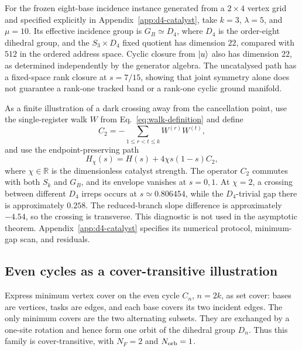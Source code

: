 For the frozen eight-base incidence instance generated from a $2\times4$
vertex grid and specified explicitly in Appendix~\ref{app:d4-catalyst}, take
$k=3$, $\lambda=5$, and $\mu=10$.  Its effective incidence group is
$G_B\simeq D_4$, where $D_4$ is the order-eight dihedral group, and the
$S_3\times D_4$ fixed quotient has dimension $22$,
compared with $512$ in the ordered address space.  Cyclic closure from
$\lvert u\rangle$ also has dimension $22$, as determined independently by the
generator algebra.  The uncatalysed path has a fixed-space rank closure at
$s=7/15$, showing that joint symmetry alone does not guarantee a rank-one
tracked band or a rank-one cyclic ground manifold.

As a finite illustration of a dark crossing away from the cancellation
point, use the single-register walk $W$ from
Eq.~\eqref{eq:walk-definition} and define
\begin{equation}
 C_2=-\sum_{1\leq r<t\leq k}W^{(r)}W^{(t)},
 \label{eq:d4-catalyst-operator}
\end{equation}
and use the endpoint-preserving path
\begin{equation}
 H_\chi(s)=H(s)+4\chi s(1-s)C_2,
 \label{eq:d4-catalyst-path}
\end{equation}
where $\chi\in\mathbb R$ is the dimensionless catalyst strength.
The operator $C_2$ commutes with both $S_k$ and $G_B$, and its envelope
vanishes at $s=0,1$.  At $\chi=2$, a crossing between different $D_4$
irreps occurs at $s\simeq0.806454$, while the $D_4$-trivial gap there is
approximately $0.258$.  The reduced-branch slope difference is
approximately $-4.54$, so the crossing is transverse.  This diagnostic is
not used in the asymptotic theorem.  Appendix~\ref{app:d4-catalyst}
specifies its numerical protocol,
minimum-gap scan, and residuals.

\subsection{Even cycles as a cover-transitive illustration}

Express minimum vertex cover on the even cycle $C_n$, $n=2k$, as set cover:
bases are vertices, tasks are edges, and each base covers its two incident
edges.  The only minimum covers are the two alternating subsets.  They are
exchanged by a one-site rotation and hence form one orbit of the dihedral
group $D_n$.  Thus this family is cover-transitive, with
$N_F=2$ and $N_{\rm orb}=1$.

